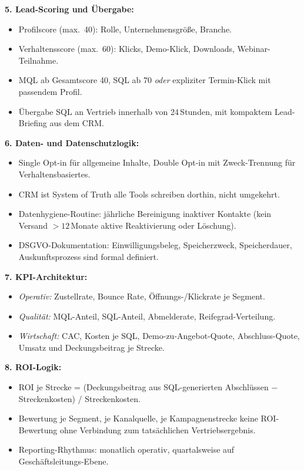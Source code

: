\documentclass[11pt,a4paper,oneside]{article}
\begin{document}
\begin{loesungbox}
\smallskip
\textbf{5. Lead-Scoring und Übergabe:}
\begin{itemize}
  \item Profilscore (max.\ 40): Rolle, Unternehmensgröße, Branche.
  \item Verhaltensscore (max.\ 60): Klicks, Demo-Klick, Downloads, Webinar-Teilnahme.
  \item MQL ab Gesamtscore 40, SQL ab 70 \emph{oder} expliziter Termin-Klick mit passendem Profil.
  \item Übergabe SQL an Vertrieb innerhalb von 24\,Stunden, mit kompaktem Lead-Briefing aus dem CRM.
\end{itemize}

\smallskip
\textbf{6. Daten- und Datenschutzlogik:}
\begin{itemize}
  \item Single Opt-in für allgemeine Inhalte, Double Opt-in mit Zweck-Trennung für Verhaltensbasiertes.
  \item CRM ist System of Truth \textendash{} alle Tools schreiben dorthin, nicht umgekehrt.
  \item Datenhygiene-Routine: jährliche Bereinigung inaktiver Kontakte (kein Versand $> 12$\,Monate \textrightarrow{} aktive Reaktivierung oder Löschung).
  \item DSGVO-Dokumentation: Einwilligungsbeleg, Speicherzweck, Speicherdauer, Auskunftsprozess sind formal definiert.
\end{itemize}

\smallskip
\textbf{7. KPI-Architektur:}
\begin{itemize}
  \item \emph{Operativ:} Zustellrate, Bounce Rate, Öffnungs-/Klickrate je Segment.
  \item \emph{Qualität:} MQL-Anteil, SQL-Anteil, Abmelderate, Reifegrad-Verteilung.
  \item \emph{Wirtschaft:} CAC, Kosten je SQL, Demo-zu-Angebot-Quote, Abschluss-Quote, Umsatz und Deckungsbeitrag je Strecke.
\end{itemize}

\smallskip
\textbf{8. ROI-Logik:}
\begin{itemize}
  \item ROI je Strecke = (Deckungsbeitrag aus SQL-generierten Abschlüssen $-$ Streckenkosten) / Streckenkosten.
  \item Bewertung je Segment, je Kanalquelle, je Kampagnenstrecke \textendash{} keine ROI-Bewertung ohne Verbindung zum tatsächlichen Vertriebsergebnis.
  \item Reporting-Rhythmus: monatlich operativ, quartalsweise auf Geschäftsleitungs-Ebene.
\end{itemize}


\end{loesungbox}
\end{document}

